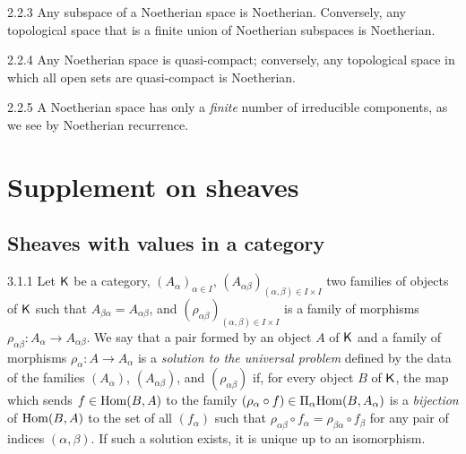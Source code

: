 \begin{env}{2.2.3}
\label{env-0.2.2.3}
Any subspace of a Noetherian space is Noetherian. Conversely, any topological space that is a
finite union of Noetherian subspaces is Noetherian.
\end{env}

\begin{env}{2.2.4}
\label{env-0.2.2.4}
Any Noetherian space is quasi-compact; conversely, any  topological space in which all open
sets are quasi-compact is Noetherian.
\end{env}

\begin{env}{2.2.5}
\label{env-0.2.2.5}
A Noetherian space has only a \emph{finite} number of irreducible components, as we see by
Noetherian recurrence.
\end{env}

\section{Supplement on sheaves}
\label{0-prelim-3}

\subsection{Sheaves with values in a category}
\label{0-prelim-3.1}

\begin{env}{3.1.1}
\label{env-0.3.1.1}
Let $\mathsf{K}$ be a category, $(A_\alpha)_{\alpha\in I}$,
$(A_{\alpha\beta})_{(\alpha,\beta)\in I\times I}$ two families of objects of $\mathsf{K}$ such
that $A_{\beta\alpha}=A_{\alpha\beta}$, and
$(\rho_{\alpha\beta})_{(\alpha,\beta)\in I\times I}$ is a family of morphisms
$\rho_{\alpha\beta}:A_\alpha\to A_{\alpha\beta}$. We say that a pair formed by an object $A$
of $\mathsf{K}$ and a family of morphisms $\rho_\alpha:A\to A_\alpha$ is a \emph{solution to the
universal problem} defined by the data of the families $(A_\alpha)$, $(A_{\alpha\beta})$,
and $(\rho_{\alpha\beta})$ if, for every object $B$ of $\mathsf{K}$, the map which sends
$f\in{\mathop{\mathrm{Hom}}\nolimits}(B,A)$ to the family
$(\rho_\alpha\circ f)\in\Pi_\alpha{\mathop{\mathrm{Hom}}\nolimits}(B,A_\alpha)$ is a \emph{bijection} of ${\mathop{\mathrm{Hom}}\nolimits}(B,A)$ to
the set of all $(f_\alpha)$ such that
$\rho_{\alpha\beta}\circ f_\alpha=\rho_{\beta\alpha}\circ f_\beta$ for any pair of indices
$(\alpha,\beta)$. If such a solution exists, it is unique up to an isomorphism.
\end{env}

